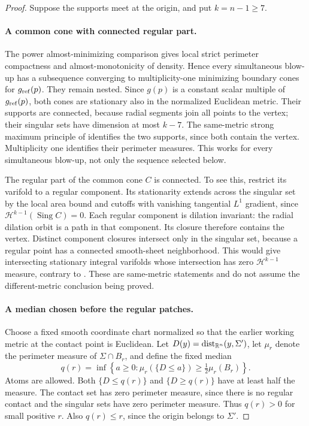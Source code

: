 \begin{proof}
Suppose the supports meet at the origin, and put $k=n-1\ge7$.

\paragraph{A common cone with connected regular part.}
The power almost-minimizing comparison gives local strict perimeter
compactness and almost-monotonicity of density. Hence every simultaneous
blow-up has a subsequence converging to multiplicity-one minimizing
boundary cones for $g_{\rm ref}(p)$. They remain nested. Since
$g(p)$ is a constant scalar multiple of $g_{\rm ref}(p)$, both
cones are stationary also in the normalized Euclidean metric.
Their supports are connected, because radial segments join all points
to the vertex; their singular sets have dimension at most $k-7$.
The same-metric strong maximum principle of
\cite[Theorem~1.1 and Remark~(3)]{Wickramasekera2014Maximum} identifies
the two supports, since both contain the vertex. Multiplicity one
identifies their perimeter measures. This works for every simultaneous
blow-up, not only the sequence selected below.

The regular part of the common cone $C$ is connected. To see this,
restrict its varifold to a regular component. Its stationarity extends
across the singular set by the local area bound and cutoffs with
vanishing tangential $L^1$ gradient, since
$\mathcal H^{k-1}(\operatorname{Sing}C)=0$. Each regular component
is dilation invariant: the radial dilation orbit is a path in that
component. Its closure therefore contains the vertex. Distinct component
closures intersect only in the singular set, because a regular point
has a connected smooth-sheet neighborhood. This would give intersecting
stationary integral varifolds whose intersection has zero
$\mathcal H^{k-1}$ measure, contrary to
\cite[Theorem~3.2 and the proof of Theorem~1.1, pp.~8--9]
{Wickramasekera2014Maximum}. These are same-metric statements and do
not assume the different-metric conclusion being proved.

\paragraph{A median chosen before the regular patches.}
Choose a fixed smooth coordinate chart normalized so that the earlier
working metric at the contact point is Euclidean. Let
$D(y)=\operatorname{dist}_{\mathbb R^n}(y,\Sigma')$, let $\mu_r$ denote the perimeter
measure of $\Sigma\cap B_r$, and define the fixed median
\begin{equation}\label{eq:rpi:separation-median}
 q(r)=\inf\left\{a\ge0:
   \mu_r(\{D\le a\})\ge\tfrac12\mu_r(B_r)\right\}.
\end{equation}
Atoms are allowed. Both $\{D\le q(r)\}$ and $\{D\ge q(r)\}$
have at least half the measure. The contact set has zero perimeter
measure, since there is no regular contact and the singular sets have
zero perimeter measure. Thus $q(r)>0$ for small positive $r$.
Also $q(r)\le r$, since the origin belongs to $\Sigma'$.


\end{proof}
